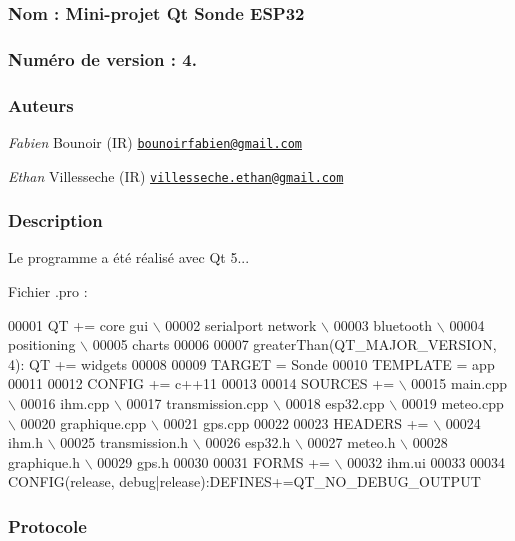 \subsubsection*{Nom \+: Mini-\/projet Qt Sonde E\+S\+P32}

\subsubsection*{Numéro de version \+: 4.}

\subsubsection*{Auteurs}

{\itshape Fabien} Bounoir (IR) \href{mailto:bounoirfabien@gmail.com}{\tt bounoirfabien@gmail.\+com}

{\itshape Ethan} Villesseche (IR) \href{mailto:villesseche.ethan@gmail.com}{\tt villesseche.\+ethan@gmail.\+com}

\subsubsection*{Description}

Le programme a été réalisé avec Qt 5...

Fichier {\ttfamily .pro} \+:


\begin{DoxyCode}
00001 QT       += core gui \(\backslash\)
00002             serialport network \(\backslash\)
00003             bluetooth \(\backslash\)
00004             positioning \(\backslash\)
00005             charts
00006 
00007 greaterThan(QT\_MAJOR\_VERSION, 4): QT += widgets
00008 
00009 TARGET = Sonde
00010 TEMPLATE = app
00011 
00012 CONFIG += c++11
00013 
00014 SOURCES += \(\backslash\)
00015         main.cpp \(\backslash\)
00016         ihm.cpp \(\backslash\)
00017     transmission.cpp \(\backslash\)
00018     esp32.cpp \(\backslash\)
00019     meteo.cpp \(\backslash\)
00020     graphique.cpp \(\backslash\)
00021     gps.cpp
00022 
00023 HEADERS += \(\backslash\)
00024         ihm.h \(\backslash\)
00025     transmission.h \(\backslash\)
00026     esp32.h \(\backslash\)
00027     meteo.h \(\backslash\)
00028     graphique.h \(\backslash\)
00029     gps.h
00030 
00031 FORMS += \(\backslash\)
00032         ihm.ui
00033 
00034 CONFIG(release, debug|release):DEFINES+=QT\_NO\_DEBUG\_OUTPUT
\end{DoxyCode}


\subsubsection*{Protocole}


